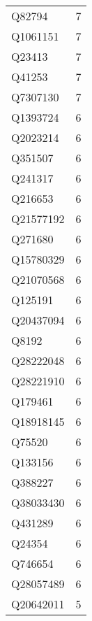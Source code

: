 \begin{tabular}{lr}
      Q82794 &                             7 \\
    Q1061151 &                             7 \\
      Q23413 &                             7 \\
      Q41253 &                             7 \\
    Q7307130 &                             7 \\
    Q1393724 &                             6 \\
    Q2023214 &                             6 \\
     Q351507 &                             6 \\
     Q241317 &                             6 \\
     Q216653 &                             6 \\
   Q21577192 &                             6 \\
     Q271680 &                             6 \\
   Q15780329 &                             6 \\
   Q21070568 &                             6 \\
     Q125191 &                             6 \\
   Q20437094 &                             6 \\
       Q8192 &                             6 \\
   Q28222048 &                             6 \\
   Q28221910 &                             6 \\
     Q179461 &                             6 \\
   Q18918145 &                             6 \\
      Q75520 &                             6 \\
     Q133156 &                             6 \\
     Q388227 &                             6 \\
   Q38033430 &                             6 \\
     Q431289 &                             6 \\
      Q24354 &                             6 \\
     Q746654 &                             6 \\
   Q28057489 &                             6 \\
   Q20642011 &                             5 \\

\end{tabular}
